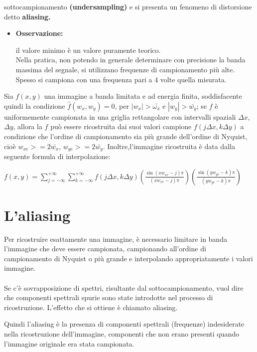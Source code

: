 sottocampionamento \textbf{(undersampling)} e si presenta un fenomeno di
distorsione detto \textbf{aliasing.}
\begin{itemize}
    \item \textbf{Osservazione:}

          il valore minimo è un valore puramente teorico. \\Nella pratica, non
          potendo in generale determinare con precisione la banda massima del
          segnale, si utilizzano frequenze di campionamento più alte. \\Spesso
          si campiona con una frequenza pari a 4 volte quella misurata.
\end{itemize}
\begin{theorem}
    Sia $f(x,y)$ una immagine a banda limitata e ad energia finita,
    soddisfacente quindi la condizione $\hat{f}(w_x,w_y) = 0$, per $| w_x | >
        \bar{ω_x}$ e $| w_y | > \bar{w_y}$; se $f$ è uniformemente campionata in una
    griglia rettangolare con intervalli spaziali $\Delta x$, $\Delta y$, allora
    la $f$ può essere ricostruita dai suoi valori campione $f(j \Delta x, k
        \Delta y)$ a condizione che l’ordine di campionamento sia più grande
    dell’ordine di Nyquist, cioè $w_{xe} >= 2 \bar{w_x}$, $w_{ye} >= 2
        \bar{w_y}$. Inoltre,l’immagine ricostruita è data dalla seguente formula di
    interpolazione:
\end{theorem}
\begin{center}
    $f(x,y) = \sum_{j=-\infty}^{+\infty} \sum_{k=-\infty}^{+\infty} f(j \Delta
        x, k \Delta y) (\frac{\sin(xw_{xe}-j)\pi}{(xw_{xe}-j)\pi})
        (\frac{\sin(yw_{ye}-k)\pi}{(yw_{ye}-k)\pi})$
\end{center}
\section{L'aliasing}
Per ricostruire esattamente una immagine, è necessario limitare in banda
l’immagine che deve essere campionata, campionando all’ordine di campionamento
di Nyquist o più grande e interpolando appropriatamente i valori immagine.
\\\\Se c’è sovrapposizione di spettri, risultante dal sottocampionamento, vuol
dire che componenti spettrali spurie sono state introdotte nel processo di
ricostruzione. L’effetto che si ottiene è chiamato aliasing.

Quindi l'aliasing è la presenza di componenti spettrali (frequenze) indesiderate
nella ricostruzione dell’immagine, componenti che non erano presenti quando
l’immagine originale era stata campionata.

